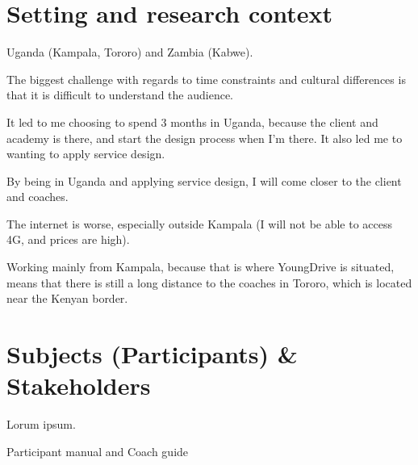 

\section{Setting and research context}
Uganda (Kampala, Tororo) and Zambia (Kabwe).

The biggest challenge with regards to time constraints and cultural differences is that it is difficult to understand the audience.

It led to me choosing to spend 3 months in Uganda, because the client and academy is there, and start the design process when I'm there. It also led me to wanting to apply service design.

By being in Uganda and applying service design, I will come closer to the client and coaches.

The internet is worse, especially outside Kampala (I will not be able to access 4G, and prices are high).

Working mainly from Kampala, because that is where YoungDrive is situated, means that there is still a long distance to the coaches in Tororo, which is located near the Kenyan border.

\section{Subjects (Participants) \& Stakeholders}

Lorum ipsum.

Participant manual and Coach guide






